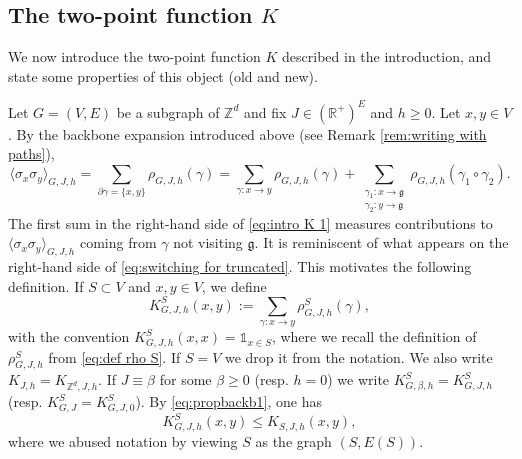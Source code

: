 \documentclass[10pt,a4paper]{amsart}
\numberwithin{equation}{section}
\newcommand\fg{\mathfrak{g}}
\begin{document}
	


\subsection{The two-point function $K$}\label{sec:2pt K}

We now introduce the two-point function $K$ described in the introduction, and state some properties of this object (old and new).

 Let $G=(V,E)$ be a subgraph of $\mathbb Z^d$ and fix $J\in (\mathbb R^+)^E$ and
$h\geq 0$. Let $x,y\in V$. By the backbone expansion introduced above (see Remark \ref{rem:writing with paths}),
\begin{equation}\label{eq:intro K 1}
	\langle \sigma_x\sigma_y\rangle_{G,J,h}=\sum_{\partial \gamma=\{x,y\}}\rho_{G,J,h}(\gamma)=\sum_{\gamma:x\rightarrow y}\rho_{G,J,h}(\gamma)+\sum_{\substack{\gamma_1:x\rightarrow \fg\\\gamma_2:y\rightarrow \fg}}\rho_{G,J,h}(\gamma_1\circ \gamma_2).
\end{equation}
The first sum in the right-hand side of \eqref{eq:intro K 1} measures contributions to $\langle \sigma_x\sigma_y\rangle_{G,J,h}$ coming from $\gamma$ not visiting $\fg$. It is reminiscent of what appears on the right-hand side of \eqref{eq:switching for truncated}. This motivates the following definition. If $S\subset V$ and $x,y\in V$, we define
\begin{equation}
	K_{G,J,h}^S(x,y):=\sum_{\gamma:x\rightarrow y}\rho_{G,J,h}^S(\gamma),
\end{equation}
with the convention $K_{G,J,h}^S(x,x)=\mathds{1}_{x\in S}$,
where we recall the definition of $\rho_{G,J,h}^S$ from \eqref{eq:def rho S}.
If $S=V$ we drop it from the notation. We also write $K_{J,h}=K_{\mathbb Z^d,J,h}$. If $J\equiv \beta$ for some $\beta\geq 0$ (resp. $h=0$) we write $K^S_{G,\beta,h}=K_{G,J,h}^S$ (resp. $K^S_{G,J}=K^S_{G,J,0}$). By \eqref{eq:propbackb1}, one has
\begin{equation}\label{eq: K^S vs K_S}
	K^S_{G,J,h}(x,y)\leq K_{S,J,h}(x,y),
\end{equation}
where we abused notation by viewing $S$ as the graph $(S,E(S))$.
\end{document}
